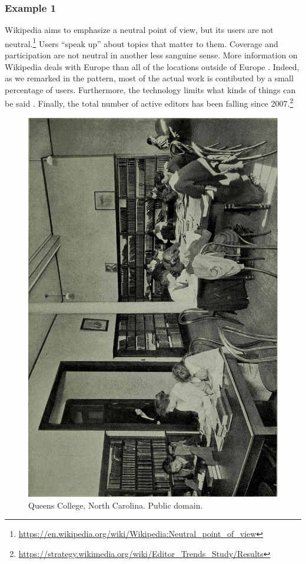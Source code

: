 

\subsubsection*{Example 1}
Wikipedia aims to emphasize a neutral point of view, but its users are
not neutral.\footnote{\url{https://en.wikipedia.org/wiki/Wikipedia:Neutral_point_of_view}}
Users ``speak up'' about topics that matter to them.  
Coverage and participation are not neutral in another less sanguine sense.
More information on Wikipedia deals with Europe than
all of the locations outside of Europe \citep{graham2014uneven}.
Indeed, as we remarked in the  pattern, most of the
actual work is contibuted by a small percentage of users.
%
Furthermore, the technology limits what kinds of things can be said \cite{graham2014uneven}. 
%
Finally, the total number of active editors has been
falling since
2007.\footnote{\url{https://strategy.wikimedia.org/wiki/Editor_Trends_Study/Results}}

\begin{figure}
\vspace{-.85cm}
\begin{center}
\includegraphics[width=.3\textwidth,angle=-90,trim=0 0 10 10, clip=true]{ladies-hall}
\end{center}
\vspace{-.5cm}
\caption{Queens College, North Carolina. Public
  domain.\label{ladies-hall}}
\vspace{-.3cm}
\end{figure}


